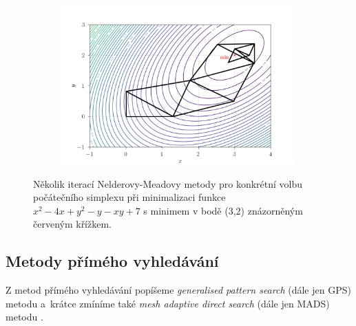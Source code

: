 \begin{figure}[H]
\begin{subfigure}[b]{0.32\textwidth}
	\end{subfigure}
	\begin{center}
		\begin{subfigure}[b]{0.66\textwidth}
			\centering
			\includegraphics[width=0.985\textwidth, trim={0 6mm 0 9mm}]{Images/nelder.png}
		\end{subfigure}
	\end{center}

	\caption{Několik iterací Nelderovy-Meadovy metody pro konkrétní volbu počátečního simplexu při minimalizaci funkce $ x^2 - 4x + y^2 - y - xy + 7 $ s minimem v bodě (3,2) znázorněným červeným křížkem.}
	\label{fig:NM}
\end{figure}


\subsection{Metody přímého vyhledávání}\label{direct-search}
Z metod přímého vyhledávání popíšeme \textit{generalised pattern search} (dále jen GPS) metodu \cite{Audet2002} a~krátce zmíníme také \textit{mesh adaptive direct search} (dále jen MADS) metodu \cite{Audet2006}.

